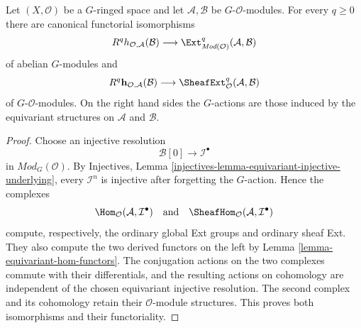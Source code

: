 \begin{lemma}
\label{lemma-equivariant-underlying-ext}
\begin{reference}
\cite[Chapter V, \S 5.6, pp. 216--217]{Tohoku}
\end{reference}
Let $(X,\mathcal O)$ be a $G$-ringed space and let
$\mathcal A,\mathcal B$ be $G$-$\mathcal O$-modules. For every $q\geq 0$
there are canonical functorial isomorphisms
$$
R^qh_{\mathcal O,\mathcal A}(\mathcal B)
\longrightarrow
\Ext^q_{\textit{Mod}(\mathcal O)}(\mathcal A,\mathcal B)
$$
of abelian $G$-modules and
$$
R^q\mathbf h_{\mathcal O,\mathcal A}(\mathcal B)
\longrightarrow
\SheafExt^q_{\mathcal O}(\mathcal A,\mathcal B)
$$
of $G$-$\mathcal O$-modules. On the right hand sides the $G$-actions are those
induced by the equivariant structures on $\mathcal A$ and $\mathcal B$.
\end{lemma}

\begin{proof}
Choose an injective resolution
$$
\mathcal B[0]\longrightarrow\mathcal I^\bullet
$$
in $\textit{Mod}_G(\mathcal O)$. By Injectives, Lemma
\ref{injectives-lemma-equivariant-injective-underlying}, every
$\mathcal I^n$ is injective after forgetting the $G$-action. Hence the
complexes
$$
\Hom_{\mathcal O}(\mathcal A,\mathcal I^\bullet)
\quad\text{and}\quad
\SheafHom_{\mathcal O}(\mathcal A,\mathcal I^\bullet)
$$
compute, respectively, the ordinary global Ext groups and ordinary sheaf
Ext. They also compute the two derived functors on the left by Lemma
\ref{lemma-equivariant-hom-functors}. The conjugation actions on the two
complexes commute with their differentials, and the resulting actions on
cohomology are independent of the chosen equivariant injective resolution.
The second complex and its cohomology retain their $\mathcal O$-module
structures. This proves both isomorphisms and their functoriality.
\end{proof}


